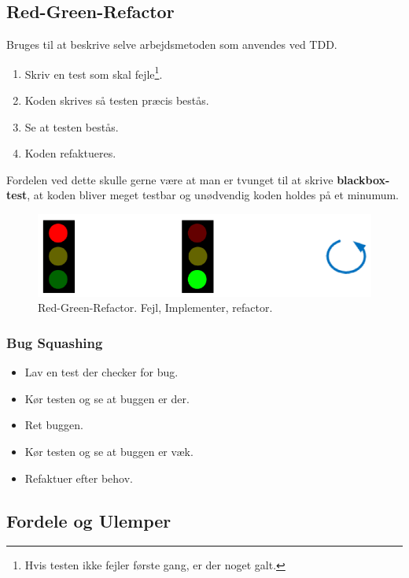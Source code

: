 \subsection{Red-Green-Refactor}
Bruges til at beskrive selve arbejdsmetoden som anvendes ved TDD.

\begin{enumerate}
	\item Skriv en test som skal fejle\footnote{Hvis testen ikke fejler første gang, er der noget galt.}.
	\item Koden skrives så testen præcis bestås.
	\item Se at testen bestås.
	\item Koden refaktueres.
\end{enumerate}

Fordelen ved dette skulle gerne være at man er tvunget til at skrive \textbf{blackbox-test}, at koden bliver meget testbar og unødvendig koden holdes på et minumum.

\begin{figure}[H]
\centering
\includegraphics[width=0.7\linewidth]{figs/redgreen}
\caption{Red-Green-Refactor. Fejl, Implementer, refactor.}
\label{fig:redgreen}
\end{figure}

\subsubsection{Bug Squashing}

\begin{itemize}
	\item Lav en test der checker for bug.
	\item Kør testen og se at buggen er der.
	\item Ret buggen.
	\item Kør testen og se at buggen er væk.
	\item Refaktuer efter behov.
\end{itemize}

\subsection{Fordele og Ulemper}

